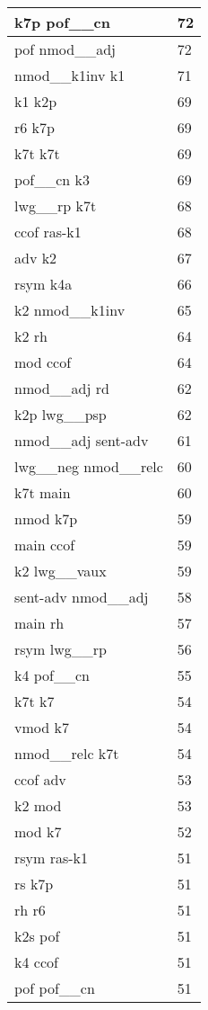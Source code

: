 \documentclass[a4 paper]{article}
\begin{document}
\begin{longtable}{p{}p{}}
k7p pof\_\_cn  & 72 \\ \midrule
pof nmod\_\_adj  & 72 \\ \midrule
nmod\_\_k1inv k1  & 71 \\ \midrule
k1 k2p  & 69 \\ \midrule
r6 k7p  & 69 \\ \midrule
k7t k7t  & 69 \\ \midrule
pof\_\_cn k3  & 69 \\ \midrule
lwg\_\_rp k7t  & 68 \\ \midrule
ccof ras-k1  & 68 \\ \midrule
adv k2  & 67 \\ \midrule
rsym k4a  & 66 \\ \midrule
k2 nmod\_\_k1inv  & 65 \\ \midrule
k2 rh  & 64 \\ \midrule
mod ccof  & 64 \\ \midrule
nmod\_\_adj rd  & 62 \\ \midrule
k2p lwg\_\_psp  & 62 \\ \midrule
nmod\_\_adj sent-adv  & 61 \\ \midrule
lwg\_\_neg nmod\_\_relc  & 60 \\ \midrule
k7t main  & 60 \\ \midrule
nmod k7p  & 59 \\ \midrule
main ccof  & 59 \\ \midrule
k2 lwg\_\_vaux  & 59 \\ \midrule
sent-adv nmod\_\_adj  & 58 \\ \midrule
main rh  & 57 \\ \midrule
rsym lwg\_\_rp  & 56 \\ \midrule
k4 pof\_\_cn  & 55 \\ \midrule
k7t k7  & 54 \\ \midrule
vmod k7  & 54 \\ \midrule
nmod\_\_relc k7t  & 54 \\ \midrule
ccof adv  & 53 \\ \midrule
k2 mod  & 53 \\ \midrule
mod k7  & 52 \\ \midrule
rsym ras-k1  & 51 \\ \midrule
rs k7p  & 51 \\ \midrule
rh r6  & 51 \\ \midrule
k2s pof  & 51 \\ \midrule
k4 ccof  & 51 \\ \midrule
pof pof\_\_cn  & 51 \\ \midrule

\end{longtable}
\end{document}
